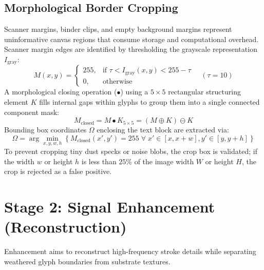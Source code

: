 \subsection{Morphological Border Cropping}
Scanner margins, binder clips, and empty background margins represent uninformative canvas regions that consume storage and computational overhead. Scanner margin edges are identified by thresholding the grayscale representation $I_{\text{gray}}$:
\begin{equation}
M(x, y) = \begin{cases} 255, & \text{if } \tau < I_{\text{gray}}(x, y) < 255 - \tau \\ 0, & \text{otherwise} \end{cases} \quad (\tau = 10)
\end{equation}
A morphological closing operation ($\bullet$) using a $5 \times 5$ rectangular structuring element $K$ fills internal gaps within glyphs to group them into a single connected component mask:
\begin{equation}
M_{\text{closed}} = M \bullet K_{5\times5} = (M \oplus K) \ominus K
\end{equation}
Bounding box coordinates $\Omega$ enclosing the text block are extracted via:
\begin{equation}
\Omega = \arg\min_{x,y,w,h} \left\{ M_{\text{closed}}(x', y') = 255 \; \forall \; x' \in [x, x+w], y' \in [y, y+h] \right\}
\end{equation}
To prevent cropping tiny dust specks or noise blobs, the crop box is validated; if the width $w$ or height $h$ is less than $25\%$ of the image width $W$ or height $H$, the crop is rejected as a false positive.

\section{Stage 2: Signal Enhancement (Reconstruction)}

Enhancement aims to reconstruct high-frequency stroke details while separating weathered glyph boundaries from substrate textures.

